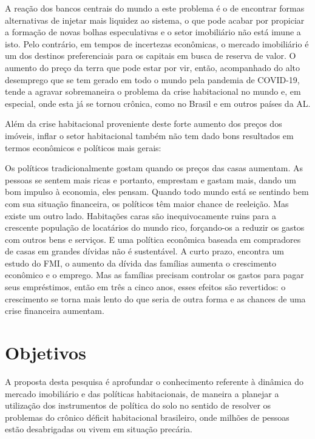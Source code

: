 \documentclass[
	12pt,				%
	oneside,			%
	a4paper,			%
	chapter=TITLE,		%
	section=TITLE,		%
	english,			%
	brazil				%
	]{abntex2}
\begin{document}
\begin{refsection}
A reação dos bancos centrais do mundo a este problema é o de encontrar formas
alternativas de injetar mais liquidez ao sistema, o que pode acabar por
propiciar a formação de novas bolhas especulativas e o setor imobiliário não
está imune a isto. Pelo contrário, em tempos de incertezas econômicas, o
mercado imobiliário é um dos destinos preferenciais para os capitais em busca
de reserva de valor. O aumento do preço da terra que pode estar por vir, então,
acompanhado do alto desemprego que se tem gerado em todo o mundo pela pandemia
de COVID-19, tende a agravar sobremaneira o problema da crise habitacional no
mundo e, em especial, onde esta já se tornou crônica, como no Brasil e em outros
países da \gls{AL}.

Além da crise habitacional proveniente deste forte aumento dos preços dos
imóveis, inflar o setor habitacional também não tem dado bons resultados em
termos econômicos e políticos mais gerais:
\begin{citacao}
Os políticos tradicionalmente gostam quando os preços das casas aumentam. As
pessoas se sentem mais ricas e portanto, emprestam e gastam mais, dando um bom
impulso à economia, eles pensam. Quando todo mundo está se sentindo bem com sua
situação financeira, os políticos têm maior chance de reeleição. Mas existe um
outro lado. Habitações caras são inequivocamente ruins para a crescente
população de locatários do mundo rico, forçando-os a reduzir os gastos com
outros bens e serviços. E uma política econômica baseada em compradores de casas
em grandes dívidas não é sustentável. A curto prazo, encontra um estudo do FMI,
o aumento da dívida das famílias aumenta o crescimento econômico e o emprego.
Mas as famílias precisam controlar os gastos para pagar seus empréstimos, então
em três a cinco anos, esses efeitos são revertidos: o crescimento se torna mais
lento do que seria de outra forma e as chances de uma crise financeira aumentam.
\cite{economist-housing-2020}
\end{citacao}
\hypertarget{objetivos}{%
\section{Objetivos}\label{objetivos}}

A proposta desta pesquisa é aprofundar o conhecimento referente à dinâmica do
mercado imobiliário e das políticas habitacionais, de maneira a planejar a
utilização dos instrumentos de política do solo no sentido de resolver os
problemas do crônico déficit habitacional brasileiro, onde milhões de pessoas
estão desabrigadas ou vivem em situação precária.


\end{refsection}
\end{document}
